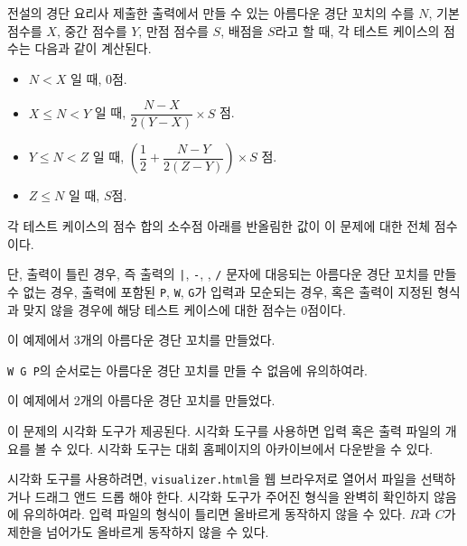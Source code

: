\begin{problem}{전설의 경단 요리사}
제출한 출력에서 만들 수 있는 아름다운 경단 꼬치의 수를 $N$, 기본 점수를 $X$, 중간 점수를 $Y$, 만점 점수를 $S$, 배점을 $S$라고 할 때, 각 테스트 케이스의 점수는 다음과 같이 계산된다.

\begin{itemize}
	\item $N<X$ 일 때, $0$점.
	\item $X \le N < Y$ 일 때, $\dfrac{N-X}{2(Y-X)} \times S$ 점.
	\item $Y \le N < Z$ 일 때, $\left(\dfrac{1}{2} + \dfrac{N-Y}{2(Z-Y)} \right) \times S$ 점.
	\item $Z \le N$ 일 때, $S$점.
\end{itemize}

각 테스트 케이스의 점수 합의 소수점 아래를 반올림한 값이 이 문제에 대한 전체 점수이다. 

단, 출력이 틀린 경우, 즉 출력의 \texttt{|}, \texttt{-}, \texttt{}, \texttt{/} 문자에 대응되는 아름다운 경단 꼬치를 만들 수 없는 경우, 출력에 포함된 \texttt{P}, \texttt{W}, \texttt{G}가 입력과 모순되는 경우, 혹은 출력이 지정된 형식과 맞지 않을 경우에 해당 테스트 케이스에 대한 점수는 0점이다.


\Examples


\renewcommand{\InputFileName}{Sample Input}
\renewcommand{\OutputFileName}{Sample Output}

\begin{example}
\end{example}

이 예제에서 3개의 아름다운 경단 꼬치를 만들었다.

\texttt{W G P}의 순서로는 아름다운 경단 꼬치를 만들 수 없음에 유의하여라.

\begin{example}
\end{example}

이 예제에서 2개의 아름다운 경단 꼬치를 만들었다.


\Visualizer

이 문제의 시각화 도구가 제공된다. 시각화 도구를 사용하면 입력 혹은 출력 파일의 개요를 볼 수 있다. 시각화 도구는 대회 홈페이지의 아카이브에서 다운받을 수 있다.

시각화 도구를 사용하려면, \texttt{visualizer.html}을 웹 브라우저로 열어서 파일을 선택하거나 드래그 앤드 드롭 해야 한다. 시각화 도구가 주어진 형식을 완벽히 확인하지 않음에 유의하여라. 입력 파일의 형식이 틀리면 올바르게 동작하지 않을 수 있다. $R$과 $C$가 제한을 넘어가도 올바르게 동작하지 않을 수 있다.


\end{problem}

